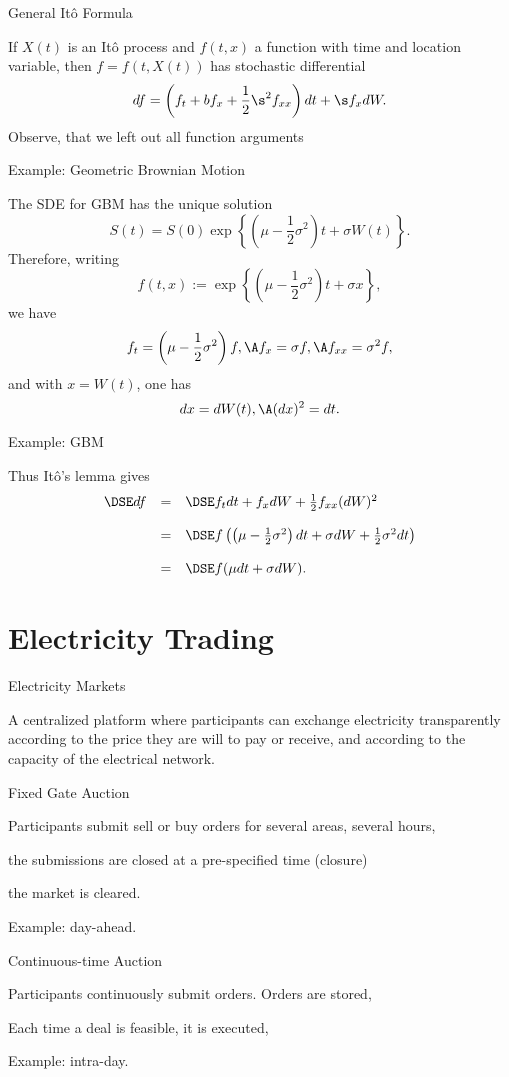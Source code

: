 { General It{\^o} Formula}

If $X(t)$ is an It{\^o} process  and $f(t,x)$ a function with time and location variable, then
$f = f(t,X(t))$ has stochastic differential
$$
df = \left(f_t + b f_x + \frac{1}{2} \s^2 f_{xx}\right) dt + \s
f_x dW.
$$
Observe, that we left out all function arguments

{ Example: Geometric Brownian Motion}

The SDE for GBM has the unique
solution
$$
S(t) = S(0) \exp \left\{\left(\mu - \frac{1}{2}\sigma^2\right)t +
\sigma W(t) \right\}\!.
$$
Therefore, writing
$$
f(t,x) := \exp\left\{\left(\mu - \frac{1}{2}\sigma^2\right)t +
\sigma x \right\}\!,
$$
we have
$$
f_t = \left(\mu - \frac{1}{2}\sigma^2\right)f, \A f_x = \sigma f,
\A f_{xx} = \sigma^2 f,
$$
and with $x = W(t)$, one has
$$
dx = dW(t), \A (dx)^2 = dt.
$$

{ Example: GBM}

Thus It\^{o}'s lemma gives
$$
\begin{array}{lll}
\DSE df &=&\DSE f_t dt + f_x dW + \frac{1}{2} f_{xx}
(dW)^2\\*[12pt] &=&\DSE f\left(\left(\mu -
\frac{1}{2}{\sigma}^2\right) dt + \sigma dW +
\frac{1}{2}{\sigma}^2 dt\right)\\*[12pt] &=&\DSE f(\mu dt + \sigma
dW).
\end{array}
$$

\section{Electricity Trading}

{Electricity Markets}

A centralized platform where participants can exchange electricity transparently
according to the price they are will to pay or receive, and according to the capacity of
the electrical network.

\item<1-> Fixed Gate Auction
\item Participants submit sell or buy orders for several areas, several hours,
\item the submissions are closed at a pre-specified time (closure)
\item the market is cleared.
\item Example: day-ahead.
\item<2-> Continuous-time Auction
\item Participants continuously submit orders. Orders are stored,
\item Each time a deal is feasible, it is executed,
\item Example: intra-day.

